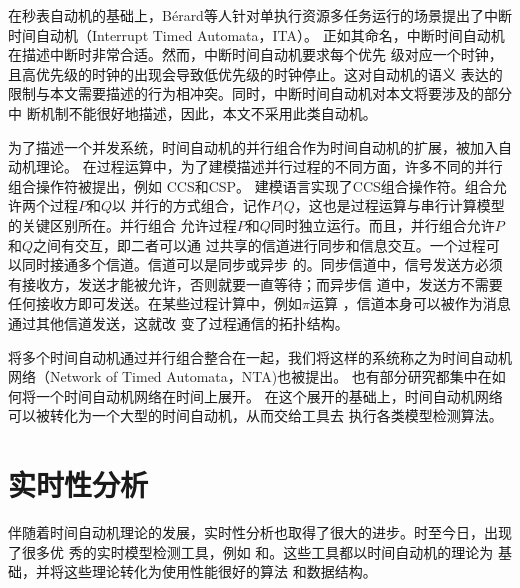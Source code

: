 在秒表自动机的基础上，B{\'e}rard等人针对单执行资源多任务运行的场景提出了中断
时间自动机（Interrupt Timed Automata，ITA）。\cite{Berard:2012:ITA:2158996.2159045}
正如其命名，中断时间自动机在描述中断时非常合适。然而，中断时间自动机要求每个优先
级对应一个时钟，且高优先级的时钟的出现会导致低优先级的时钟停止。这对自动机的语义
表达的限制与本文需要描述的行为相冲突。同时，中断时间自动机对本文将要涉及的部分中
断机制不能很好地描述，因此，本文不采用此类自动机。

为了描述一个并发系统，时间自动机的并行组合作为时间自动机的扩展，被加入自动机理论。
在过程运算中，为了建模描述并行过程的不同方面，许多不同的并行组合操作符被提出，例如
CCS\cite{Milner:1989:CC:534666}和CSP\cite{Hoare:1978:CSP:359576.359585}。\uppaal 
建模语言\cite{Larsen97uppaalin}实现了CCS组合操作符。组合允许两个过程$P$和$Q$以
并行的方式组合，记作$P|Q$，这也是过程运算与串行计算模型的关键区别所在。并行组合
允许过程$P$和$Q$同时独立运行。而且，并行组合允许$P$和$Q$之间有交互，即二者可以通
过共享的信道进行同步和信息交互。一个过程可以同时接通多个信道。信道可以是同步或异步
的。同步信道中，信号发送方必须有接收方，发送才能被允许，否则就要一直等待；而异步信
道中，发送方不需要任何接收方即可发送。在某些过程计算中，例如$\pi$运算
\cite{Sangiorgi:2001:PTM:559050}，信道本身可以被作为消息通过其他信道发送，这就改
变了过程通信的拓扑结构。

将多个时间自动机通过并行组合整合在一起，我们将这样的系统称之为时间自动机网络（Network 
of Timed Automata，NTA)也被提出。\cite{Alur:1994:TTA:180782.180519,Bouyer06timedunfoldings}
也有部分研究都集中在如何将一个时间自动机网络在时间上展开。\cite{Bouyer06timedunfoldings}
在这个展开的基础上，时间自动机网络可以被转化为一个大型的时间自动机，从而交给工具去
执行各类模型检测算法。\cite{Bengtsson04timedautomata:}

\section{实时性分析}
\label{sec:timing_study}

伴随着时间自动机理论的发展，实时性分析也取得了很大的进步。时至今日，出现了很多优
秀的实时模型检测工具，例如\uppaal \cite{Behrmann04atutorial, Larsen97efficientverification}
和\cite{Yovine97kronos:a}。这些工具都以时间自动机的理论为
基础，并将这些理论转化为使用性能很好的算法
\cite{Behrmann:2002:UIS:646847.707113, Behrmann:2006:LUB:1165374.1165376, BehrmannHV00, Behrmann:to}
和数据结构\cite{Behrmann98efficienttimed, Larsen97efficientverification, Larsen:1999:CDD:774455.774459}。


